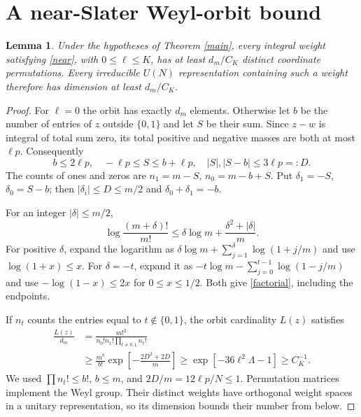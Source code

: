 \documentclass[11pt]{article}
\newtheorem{lemma}{Lemma}
\begin{document}
\newpage
\section{A near-Slater Weyl-orbit bound}
\begin{lemma}\label{weyl}
Under the hypotheses of Theorem \ref{main}, every integral weight
satisfying \eqref{near}, with $0\le\ell\le K$, has at least
$d_m/C_K$ distinct coordinate permutations. Every irreducible
$U(N)$ representation containing such a weight therefore has
dimension at least $d_m/C_K$.
\end{lemma}
\begin{proof}
For $\ell=0$ the orbit has exactly $d_m$ elements. Otherwise let $b$
be the number of entries of $z$ outside $\{0,1\}$ and let $S$ be
their sum. Since $z-w$ is integral of total sum zero, its total
positive and negative masses are both at most $\ell p$. Consequently
\begin{equation}
 b\le2\ell p,\quad -\ell p\le S\le b+\ell p,\quad
 |S|,|S-b|\le3\ell p=:D.
\end{equation}
The counts of ones and zeros are $n_1=m-S$, $n_0=m-b+S$.
Put $\delta_1=-S$, $\delta_0=S-b$; then
$|\delta_i|\le D\le m/2$ and $\delta_0+\delta_1=-b$.

For an integer $|\delta|\le m/2$,
\begin{equation}\label{factorial}
 \log\frac{(m+\delta)!}{m!}
 \le\delta\log m+\frac{\delta^2+|\delta|}{m}.
\end{equation}
For positive $\delta$, expand the logarithm as
$\delta\log m+\sum_{j=1}^{\delta}\log(1+j/m)$ and use
$\log(1+x)\le x$. For $\delta=-t$, expand it as
$-t\log m-\sum_{j=0}^{t-1}\log(1-j/m)$ and use
$-\log(1-x)\le2x$ for $0\le x\le1/2$. Both give
\eqref{factorial}, including the endpoints.

If $n_t$ counts the entries equal to $t\notin\{0,1\}$, the orbit
cardinality $L(z)$ satisfies
\begin{align}
 \frac{L(z)}{d_m}
 &=\frac{m!^2}{n_0!n_1!\prod_{t\ne0,1}n_t!}\\
 &\ge\frac{m^b}{b!}
       \exp\left[-\frac{2D^2+2D}{m}\right]
 \ge\exp[-36\ell^2\Lambda-1]\ge C_K^{-1}.\label{orbitbound}
\end{align}
We used $\prod n_t!\le b!$, $b\le m$, and
$2D/m=12\ell p/N\le1$.
Permutation matrices implement the Weyl group. Their distinct weights
have orthogonal weight spaces in a unitary representation, so its
dimension bounds their number from below.
\end{proof}
\end{document}

